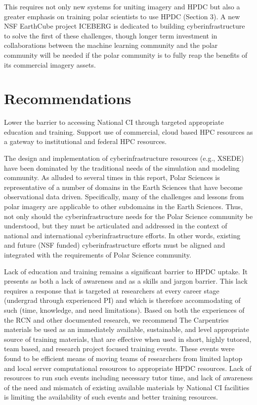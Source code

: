 \documentclass[10pt,letterpaper,draft]{article}
\begin{document}
This requires not only new systems for uniting imagery and HPDC but also a greater emphasis on training polar scientists to use HPDC (Section 3). 
A new NSF EarthCube project ICEBERG is dedicated to building cyberinfrastructure to solve the first of these challenges, though longer term investment in collaborations between the machine learning community and the polar community will be needed if the polar community is to fully reap the benefits of its commercial imagery assets.

\section*{Recommendations}
\begin{description}[style=unboxed]
  \item[1. Lowering the barrier to access to National CI:]
  Lower the barrier to accessing National CI through targeted appropriate education and training.
Support use of commercial, cloud based HPC resources as a gateway to institutional and federal HPC resources.

\item[2. Representing the needs of Earth Science in the design and analysis of National CI:]
The design and implementation of cyberinfrastructure resources (e.g., XSEDE) have been dominated by the traditional needs of the simulation and modeling community. As alluded to several times in this report, Polar Sciences is representative of a number of domains in the Earth Sciences that have become observational data driven. Specifically, many of the challenges and lessons from polar imagery are applicable to other subdomains in the Earth Sciences. Thus, not only should the cyberinfrastructure needs for the Polar Science community be understood, but they must be articulated and addressed in the context of national and international cyberinfrastructure efforts. In other words, existing and future (NSF funded) cyberinfrastructure efforts must be aligned and integrated with the requirements of Polar Science community.

\item[3. Education and Training ]
Lack of education and training remains a significant barrier to HPDC uptake. It presents as both a lack of awareness and as a skills and jargon barrier. This lack requires a response that is targeted at researchers at every career stage (undergrad through experienced PI) and which is therefore accommodating of such (time, knowledge, and need limitations). Based on both the experiences of the RCN and other documented research, we recommend The Carpentries materials be used as an immediately available, sustainable, and level appropriate source of training materials, that are effective when used in short, highly tutored, team based, and research project focused training events. These events were found to be efficient means of moving teams of researchers from limited laptop and local server computational resources to appropriate HPDC resources. Lack of resources to run such events including necessary tutor time, and lack of awareness of the need and mismatch of existing available materials by National CI facilities is limiting the availability of such events and better training resources.


\end{description}
\end{document}
